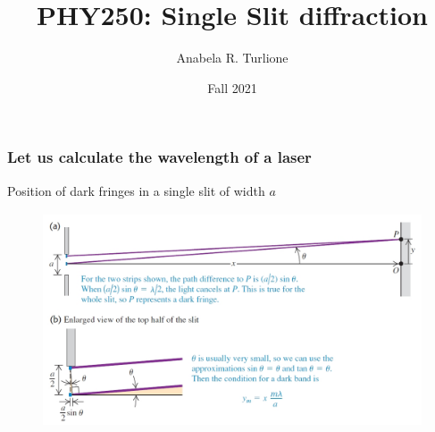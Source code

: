 \documentclass[]{beamer}
\title{PHY250: Single Slit diffraction}    %
\author{Anabela R. Turlione}                 %
\institute{Digipen}      %
\date{Fall 2021}                    %
\begin{document}
\begin{frame}
  \titlepage
\end{frame}

\section[]{}





 \setcounter{example}{1} 





 \begin{frame}
  \frametitle{Let us calculate the wavelength of a laser}

  \textcolor{mypink1}{Position of dark fringes in a single slit of width $a$}
  \begin{figure}[h!]
    \begin{center}
      \includegraphics[height=2.5in]{images/1.jpg}
    \end{center}
  \end{figure}
\end{frame}
  
\end{document}

